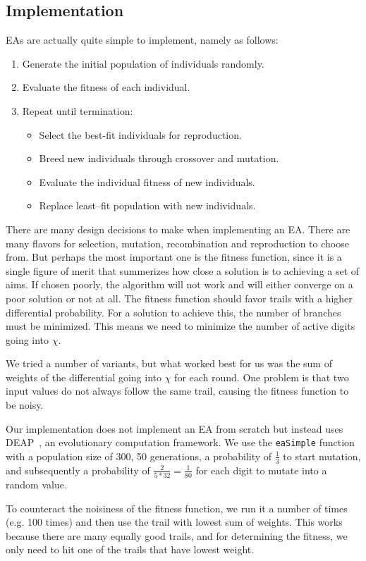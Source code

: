 \documentclass{report}
\begin{document}
\subsection{Implementation}
EAs are actually quite simple to implement, namely as follows:
\begin{enumerate}
\item Generate the initial population of individuals randomly.
\item Evaluate the fitness of each individual.
\item Repeat until termination:
\begin{itemize}
  \item Select the best-fit individuals for reproduction.
  \item Breed new individuals through crossover and mutation.
  \item Evaluate the individual fitness of new individuals.
  \item Replace least–fit population with new individuals.
\end{itemize}
\end{enumerate}
There are many design decisions to make when implementing an EA.
There are many flavors for selection, mutation, recombination and reproduction to choose from.
But perhaps the most important one is the fitness function, since it is a single figure of merit that summerizes how close a solution is to achieving a set of aims. If chosen poorly, the algorithm will not work and will either converge on a poor solution or not at all. The fitness function should favor trails with a higher differential probability. For a solution to achieve this, the number of branches must be minimized. This means we need to minimize the number of active digits going into $\chi$.

We tried a number of variants, but what worked best for us was the sum of weights of the differential going into $\chi$ for each round. One problem is that two input values do not always follow the same trail, causing the fitness function to be noisy.

Our implementation does not implement an EA from scratch but instead uses DEAP~\cite{deap2012jmlr}, an evolutionary computation framework. We use the \texttt{eaSimple} function with a population size of 300, 50 generations, a probability of $\frac{1}{3}$ to start mutation, and subsequently a probability of $\frac{2}{5*32} = \frac{1}{80}$ for each digit to mutate into a random value.

To counteract the noisiness of the fitness function, we run it a number of times (e.g. 100 times) and then use the trail with lowest sum of weights. This works because there are many equally good trails, and for determining the fitness, we only need to hit one of the trails that have lowest weight.
\end{document}
